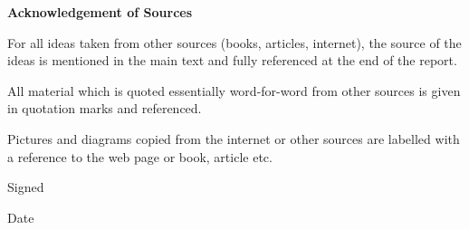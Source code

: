 \thispagestyle{plain}
\mbox{}
\vspace{60mm}
\begin{center}
    \textbf{Acknowledgement of Sources}
\end{center}
For all ideas taken from other sources (books, articles, internet),
the source of the ideas is mentioned in the main text and fully
referenced at the end of the report.

All material which is quoted essentially word-for-word from
other sources is given in quotation marks and referenced.

Pictures and diagrams copied from the internet or other sources
are labelled with a reference to the web page or book, article etc.

Signed\hspace{2mm}\underline{\hspace{40mm}}

Date\hspace{5mm}\underline{\hspace{40mm}}
\newpage
